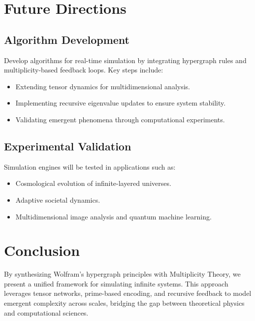 \documentclass{article}
\theoremstyle{plain}
\begin{document}
\section{Future Directions}
\subsection{Algorithm Development}
Develop algorithms for real-time simulation by integrating hypergraph rules and multiplicity-based feedback loops. Key steps include:
\begin{itemize}
    \item Extending tensor dynamics for multidimensional analysis.
    \item Implementing recursive eigenvalue updates to ensure system stability.
    \item Validating emergent phenomena through computational experiments.
\end{itemize}

\subsection{Experimental Validation}
Simulation engines will be tested in applications such as:
\begin{itemize}
    \item Cosmological evolution of infinite-layered universes.
    \item Adaptive societal dynamics.
    \item Multidimensional image analysis and quantum machine learning.
\end{itemize}

\section{Conclusion}
By synthesizing Wolfram’s hypergraph principles with Multiplicity Theory, we present a unified framework for simulating infinite systems. This approach leverages tensor networks, prime-based encoding, and recursive feedback to model emergent complexity across scales, bridging the gap between theoretical physics and computational sciences.

\nocite{*}


\end{document}
